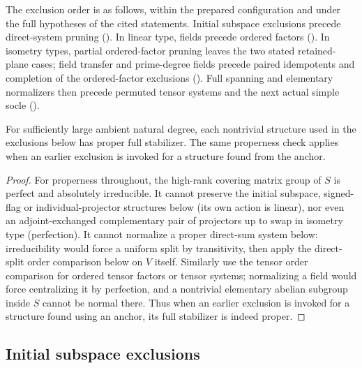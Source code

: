\begin{convention}
\begin{itemize}
\end{itemize}
\end{convention}

The exclusion order is as follows, within the prepared configuration and
under the full hypotheses of the cited statements.  Initial subspace
exclusions precede direct-system pruning
().
In linear type, fields precede ordered factors
().  In isometry types, partial
ordered-factor pruning leaves the two stated retained-plane cases;
field transfer and prime-degree fields precede paired idempotents and
completion of the ordered-factor exclusions
().
Full spanning and elementary normalizers then precede permuted tensor
systems and the next actual simple socle
().

\begin{lemma}\label{c:proper-stabilizers}
For sufficiently large ambient natural degree, each nontrivial structure used in the exclusions below has proper full stabilizer. The same properness check applies when an earlier exclusion is invoked for a structure found from the anchor.
\end{lemma}

\begin{proof}
For properness throughout, the high-rank covering matrix group of \(S\) is perfect and absolutely irreducible. It cannot preserve the initial subspace, signed-flag or individual-projector structures below (its own action is linear), nor even an adjoint-exchanged complementary pair of projectors up to swap in isometry type (perfection). It cannot normalize a proper direct-sum system below: irreducibility would force a uniform split by transitivity, then apply the direct-split order comparison below on \(V\) itself. Similarly use the tensor order comparison for ordered tensor factors or tensor systems; normalizing a field would force centralizing it by perfection, and a nontrivial elementary abelian subgroup inside \(S\) cannot be normal there. Thus when an earlier exclusion is invoked for a structure found using an anchor, its full stabilizer is indeed proper.
\end{proof}

\subsection{Initial subspace exclusions}

